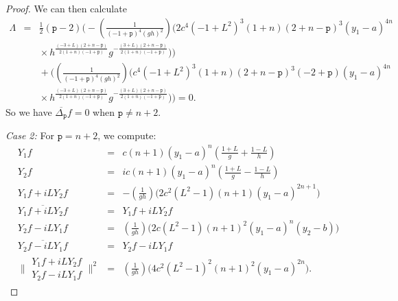 \documentclass[12pt]{amsart}
\theoremstyle{plain}
\theoremstyle{definition}
\numberwithin{equation}{section}
\begin{document}
\begin{proof}
We can then calculate 
\begin{eqnarray*}
\Lambda &= & \frac{1}{2}({\texttt{p}}-2)\bigg(-\left(\frac{1}{(-1 + {\texttt{p}})^4 (gh)^2}\right)\Big(2 c^4 (-1 + L^2)^3 (1 + n) (2 + n - {\texttt{p}})^3 (y_1-a)^{4 n}\\
&&\mbox{}\times h^{\frac{(-3 + L) (2 + n - {\texttt{p}})}{2 (1 + n) (-1 + {\texttt{p}})}}
g^{-\frac{(3 + L) (2 + n - {\texttt{p}})}{2 (1 + n) (-1 + {\texttt{p}})}}\Big)\bigg)\\
&&\mbox{}+\bigg(\left(\frac{1}{(-1 + {\texttt{p}})^4 (gh)^2} \right)
\Big(c^4 (-1 + L^2)^3 (1 + n) (2 + n - {\texttt{p}})^3 (-2 + {\texttt{p}}) (y_1-a)^{4 n} \\
&&\mbox{} \times h^{\frac{(-3 +L)(2 + n - {\texttt{p}})}{2 (1 + n) (-1 + {\texttt{p}})}} g^{-\frac{(3 + L) (2 + n - {\texttt{p}})}{2 (1 + n) (-1 + {\texttt{p}})}}\Big) \bigg)=0.
\end{eqnarray*}
So we have $\overline{\Delta_{\texttt{p}}}f=0$ when ${\texttt{p}} \neq n+2$.

\emph{Case 2:} \label{t p=n+2}
For ${\texttt{p}} = n+2$, we compute: 
\begin{eqnarray}
Y_1f & = & c(n+1)(y_1-a)^n\left(\frac{1+L}{g}+\frac{1-L}{h}\right) \nonumber\\
Y_2f & = & ic(n+1)(y_1-a)^n\left(\frac{1+L}{g}-\frac{1-L}{h}\right)\nonumber\\
Y_1f+iLY_2f & = & -\left(\frac{1}{gh}\right)\big(2c^2(L^2-1)(n+1)(y_1-a)^{2n+1}\big)\nonumber\\
\overline{Y_1f+iLY_2f} & = &Y_1f+iLY_2f \label{p=n+2 1}\\
Y_2f-iLY_1f & = &  \left(\frac{1}{gh}\right)\big(2c(L^2-1)(n+1)^2(y_1-a)^{n}(y_2-b)\big) \nonumber\\
\overline{Y_2f-iLY_1f} & = &  Y_2f-iLY_1f \label{p=n+2 2}\\
 \bigg\| \begin{array}{c}
 Y_1f+iLY_2f\\
 Y_2f-iLY_1f
\end{array} \bigg\|^{2}
& = & \left(\frac{1}{gh}\right)\big(4c^2(L^2-1)^2(n+1)^2(y_1-a)^{2n} \big). \nonumber
\end{eqnarray}


\end{proof}
\end{document}
